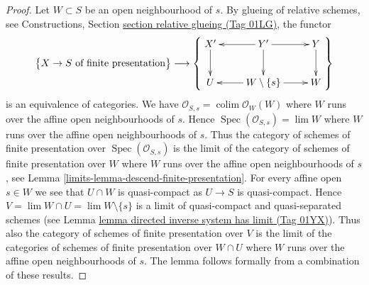 \documentclass{amsart}
\theoremstyle{plain}
\theoremstyle{definition}
\theoremstyle{remark}
\numberwithin{equation}{subsection}
\def\lim{\mathop{\mathrm{lim}}\nolimits}
\def\colim{\mathop{\mathrm{colim}}\nolimits}
\def\Spec{\mathop{\mathrm{Spec}}}
\begin{document}
\begin{proof}
Let $W \subset S$ be an open neighbourhood of $s$. By
glueing of relative schemes, see
Constructions, Section \href{https://stacks.math.columbia.edu/tag/01LG}{section relative glueing (Tag 01LG)},
the functor
$$
\left\{
\begin{matrix}
X \to S\text{ of finite presentation}
\end{matrix}
\right\}
\longrightarrow
\left\{
\vcenter{
\xymatrix{
X' \ar[d] & Y' \ar[d] \ar[l] \ar[r] & Y \ar[d] \\
U & W \setminus \{s\} \ar[l] \ar[r] & W
}
}
\right\}
$$
is an equivalence of categories. We have
$\mathcal{O}_{S, s} = \colim \mathcal{O}_W(W)$ where
$W$ runs over the affine open neighbourhoods of $s$.
Hence $\Spec(\mathcal{O}_{S, s}) = \lim W$ where $W$
runs over the affine open neighbourhoods of $s$.
Thus the category of schemes of finite presentation
over $\Spec(\mathcal{O}_{S, s})$ is the limit of the
category of schemes of finite presentation over
$W$ where $W$ runs over the affine open neighbourhoods
of $s$, see
Lemma \ref{limits-lemma-descend-finite-presentation}.
For every affine open $s \in W$ we see that $U \cap W$
is quasi-compact as $U \to S$ is quasi-compact.
Hence $V = \lim W \cap U = \lim W \setminus \{s\}$ is a limit of
quasi-compact and quasi-separated schemes (see
Lemma \href{https://stacks.math.columbia.edu/tag/01YX}{lemma directed inverse system has limit (Tag 01YX)}).
Thus also the category of schemes of finite presentation
over $V$ is the limit of the
categories of schemes of finite presentation over
$W \cap U$ where $W$ runs over the affine open neighbourhoods
of $s$. The lemma follows formally from a combination
of these results.
\end{proof}
\end{document}
